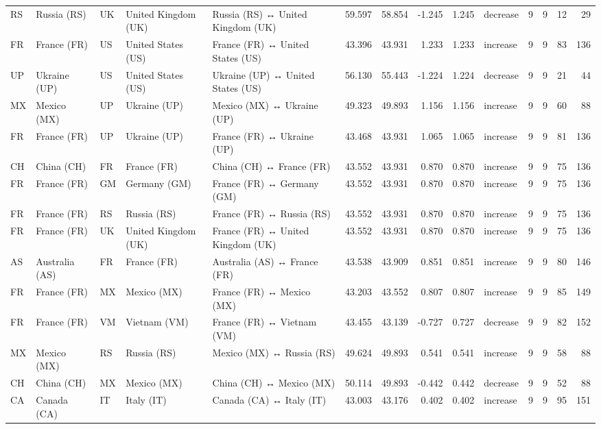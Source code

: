 \begin{tabular}{lllllrrrrlrrrr}
RS & Russia (RS) & UK & United Kingdom (UK) & Russia (RS) ↔ United Kingdom (UK) & 59.597 & 58.854 & -1.245 & 1.245 & decrease & 9 & 9 & 12 & 29 \\
FR & France (FR) & US & United States (US) & France (FR) ↔ United States (US) & 43.396 & 43.931 & 1.233 & 1.233 & increase & 9 & 9 & 83 & 136 \\
UP & Ukraine (UP) & US & United States (US) & Ukraine (UP) ↔ United States (US) & 56.130 & 55.443 & -1.224 & 1.224 & decrease & 9 & 9 & 21 & 44 \\
MX & Mexico (MX) & UP & Ukraine (UP) & Mexico (MX) ↔ Ukraine (UP) & 49.323 & 49.893 & 1.156 & 1.156 & increase & 9 & 9 & 60 & 88 \\
FR & France (FR) & UP & Ukraine (UP) & France (FR) ↔ Ukraine (UP) & 43.468 & 43.931 & 1.065 & 1.065 & increase & 9 & 9 & 81 & 136 \\
CH & China (CH) & FR & France (FR) & China (CH) ↔ France (FR) & 43.552 & 43.931 & 0.870 & 0.870 & increase & 9 & 9 & 75 & 136 \\
FR & France (FR) & GM & Germany (GM) & France (FR) ↔ Germany (GM) & 43.552 & 43.931 & 0.870 & 0.870 & increase & 9 & 9 & 75 & 136 \\
FR & France (FR) & RS & Russia (RS) & France (FR) ↔ Russia (RS) & 43.552 & 43.931 & 0.870 & 0.870 & increase & 9 & 9 & 75 & 136 \\
FR & France (FR) & UK & United Kingdom (UK) & France (FR) ↔ United Kingdom (UK) & 43.552 & 43.931 & 0.870 & 0.870 & increase & 9 & 9 & 75 & 136 \\
AS & Australia (AS) & FR & France (FR) & Australia (AS) ↔ France (FR) & 43.538 & 43.909 & 0.851 & 0.851 & increase & 9 & 9 & 80 & 146 \\
FR & France (FR) & MX & Mexico (MX) & France (FR) ↔ Mexico (MX) & 43.203 & 43.552 & 0.807 & 0.807 & increase & 9 & 9 & 85 & 149 \\
FR & France (FR) & VM & Vietnam (VM) & France (FR) ↔ Vietnam (VM) & 43.455 & 43.139 & -0.727 & 0.727 & decrease & 9 & 9 & 82 & 152 \\
MX & Mexico (MX) & RS & Russia (RS) & Mexico (MX) ↔ Russia (RS) & 49.624 & 49.893 & 0.541 & 0.541 & increase & 9 & 9 & 58 & 88 \\
CH & China (CH) & MX & Mexico (MX) & China (CH) ↔ Mexico (MX) & 50.114 & 49.893 & -0.442 & 0.442 & decrease & 9 & 9 & 52 & 88 \\
CA & Canada (CA) & IT & Italy (IT) & Canada (CA) ↔ Italy (IT) & 43.003 & 43.176 & 0.402 & 0.402 & increase & 9 & 9 & 95 & 151 \\

\end{tabular}
